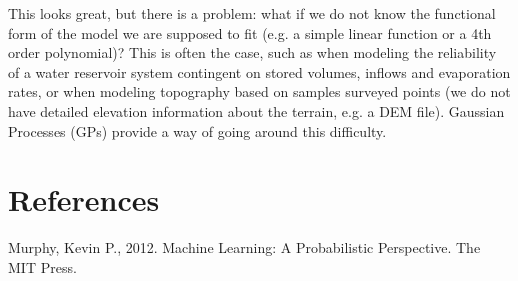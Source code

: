 \documentclass[]{article}
\begin{document}
This looks great, but there is a problem: what if we do not know the functional form of the model we are supposed to fit (e.g. a simple linear function or a 4th order polynomial)? This is often the case, such as when modeling the reliability of a water reservoir system contingent on stored volumes, inflows and evaporation rates, or when modeling topography based on samples surveyed points (we do not have detailed elevation information about the terrain, e.g. a DEM file). Gaussian Processes (GPs) provide a way of going around this difficulty.

\section{References}

Murphy, Kevin P., 2012. Machine Learning: A Probabilistic Perspective. The MIT Press.
\end{document}
